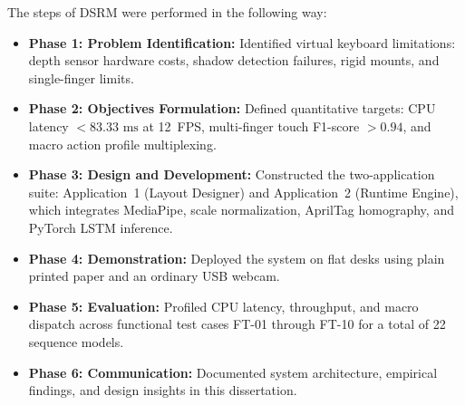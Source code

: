 The steps of DSRM were performed in the following way:
\begin{itemize}
    \item \textbf{Phase 1: Problem Identification:} Identified virtual keyboard limitations: depth sensor hardware costs, shadow detection failures, rigid mounts, and single-finger limits.
    \item \textbf{Phase 2: Objectives Formulation:} Defined quantitative targets: CPU latency $< 83.33\text{ ms}$ at 12~FPS, multi-finger touch F1-score $> 0.94$, and macro action profile multiplexing.
    \item \textbf{Phase 3: Design and Development:} Constructed the two-application suite: Application~1 (Layout Designer) and Application~2 (Runtime Engine), which integrates MediaPipe, scale normalization, AprilTag homography, and PyTorch LSTM inference.
    \item \textbf{Phase 4: Demonstration:} Deployed the system on flat desks using plain printed paper and an ordinary USB webcam.
    \item \textbf{Phase 5: Evaluation:} Profiled CPU latency, throughput, and macro dispatch across functional test cases FT-01 through FT-10 for a total of 22 sequence models.
    \item \textbf{Phase 6: Communication:} Documented system architecture, empirical findings, and design insights in this dissertation.
\end{itemize}

